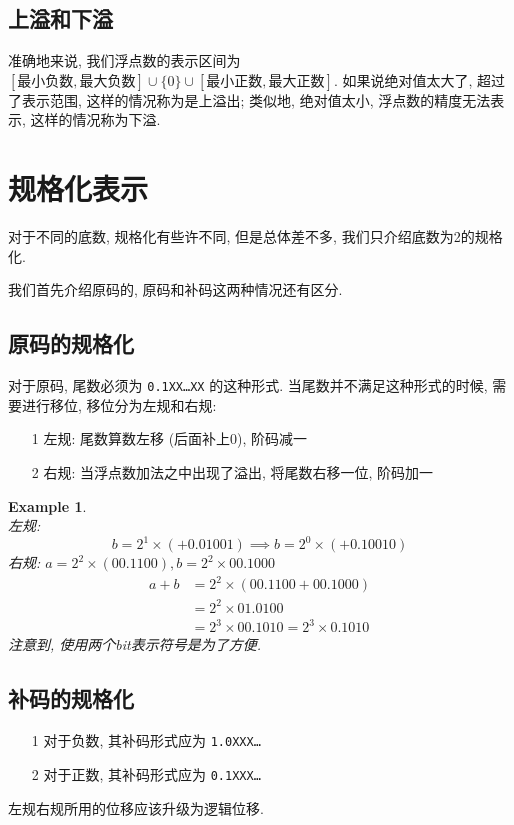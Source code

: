 \documentclass[12pt]{ctexart}
\theoremstyle{definition}
\theoremstyle{plain}
\newtheorem{exam}[definition]{Example}
\begin{document}
\subsection{上溢和下溢}
准确地来说, 我们浮点数的表示区间为 \([\text{最小负数}, \text{最大负数}] \cup \{0\} \cup [\text{最小正数}, \text{最大正数} ]\). 如果说绝对值太大了, 超过了表示范围, 这样的情况称为是上溢出; 类似地, 绝对值太小, 浮点数的精度无法表示, 这样的情况称为下溢. 


\section{规格化表示}
对于不同的底数, 规格化有些许不同, 但是总体差不多, 我们只介绍底数为2的规格化.

我们首先介绍原码的, 原码和补码这两种情况还有区分. 
\subsection{原码的规格化}
对于原码, 尾数必须为 \texttt{0.1XX\dots XX} 的这种形式. 当尾数并不满足这种形式的时候, 需要进行移位, 移位分为左规和右规:
\begin{itemize}
\item [1] 左规: 尾数算数左移 (后面补上0), 阶码减一
\item [2] 右规: 当浮点数加法之中出现了溢出, 将尾数右移一位, 阶码加一
\end{itemize}

\begin{exam}\quad\\ 
左规:
\[
b = 2 ^{1} \times (+ 0.01001) \implies b = 2 ^{0} \times (+ 0.1 0010)
\]
右规: \(a = 2^{2} \times (00.1100) , b = 2^{2	} \times 00.1000\)
\[
\begin{aligned}
a + b & = 2 ^{2} \times ( 00. 1100 + 00.1000) \\ 
& =  2^{2} \times 01.0100 \\ 
&  = 2 ^{3} \times 00.1010 = 2 ^{3} \times 0.1010
\end{aligned}
\]
注意到, 使用两个bit表示符号是为了方便. 
\end{exam}

\subsection{补码的规格化}
\begin{itemize}
\item [1] 对于负数, 其补码形式应为 \texttt{1.0XXX\dots} 
\item [2] 对于正数, 其补码形式应为 \texttt{0.1XXX\dots}
\end{itemize}
左规右规所用的位移应该升级为逻辑位移. 
\end{document}
